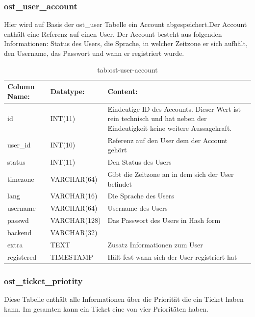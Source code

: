\subsubsection{ost\_user\_account}

Hier wird auf Basis der ost\_user Tabelle ein Account abgespeichert.Der Account enthält eine Referenz auf einen User. Der Account besteht aus folgenden Informationen: Status des Users, die Sprache, in welcher Zeitzone er sich aufhält, den Username, das Passwort und wann er registriert wurde.

\begin{table}[h]
	\begin{tabular}{|p{3.5cm}|p{4cm}|p{7.2cm}|}
		\hline
		\textbf{Column Name:} & \textbf{Datatype:} & \textbf{Content:}\\
		\hline
		id & INT(11) & Eindeutige ID des Accounts. Dieser Wert ist rein technisch und hat  neben der Eindeutigkeit keine weitere 
		Aussagekraft.\\
		\hline
		user\_id & INT(10) & Referenz auf den User dem der Account gehört\\
		\hline
		status& INT(11) & Den Status des Users \\
		\hline
		timezone & VARCHAR(64) & Gibt die Zeitzone an in dem sich der User befindet\\
		\hline
		lang & VARCHAR(16) & Die Sprache des Users\\
		\hline
		username & VARCHAR(64) & Username des Users\\
		\hline
		passwd & VARCHAR(128) & Das Passwort des Users in Hash form\\
		\hline
		backend & VARCHAR(32) &\\
		\hline
		extra & TEXT & Zusatz Informationen zum User\\
		\hline
		registered & TIMESTAMP & Hält fest wann sich der User registriert hat\\
		\hline
		
	\end{tabular}
	\caption{tab:ost-user-account}
\end{table}
\label{tab:ost_user_account}

\newpage

\subsubsection{ost\_ticket\_priotity}

Diese Tabelle enthält alle Informationen über die Priorität die ein Ticket haben kann.
Im gesamten kann ein Ticket eine von vier Prioritäten haben.

